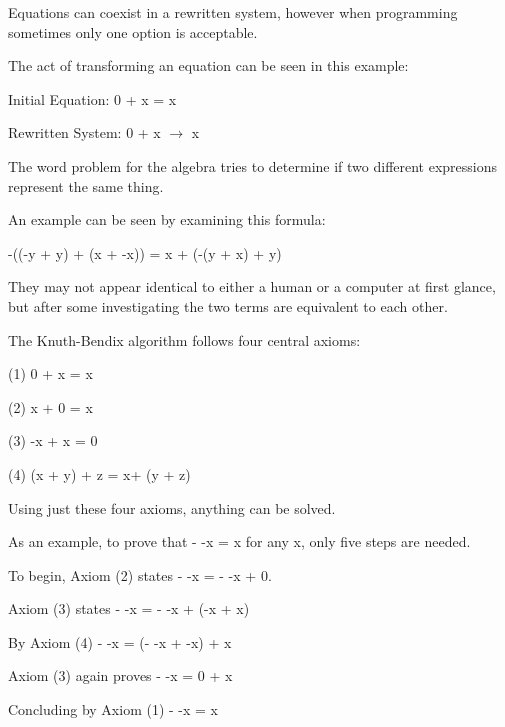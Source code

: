 \documentclass{article}
\begin{document}
\medskip\noindent
Equations can coexist in a rewritten system, however when programming sometimes only one option is acceptable. 

\medskip\noindent
The act of transforming an equation can be seen in this example:

\medskip\begin{center}
    Initial Equation: 0 + x = x
    
    Rewritten System: 0 + x $\rightarrow$ x
\end{center}

\medskip\noindent
The word problem for the algebra tries to determine if two different expressions represent the same thing. 

\medskip\noindent
An example can be seen by examining this formula:

\medskip\begin{center}
    -((-y + y) + (x + -x)) = x + (-(y + x) + y)
\end{center}

\medskip\noindent
They may not appear identical to either a human or a computer at first glance, but after some investigating the two terms are equivalent to each other. 

\begin{center}
\medskip\noindent
The Knuth-Bendix algorithm follows four central axioms:
\end{center}

\medskip
\begin{center}
(1)     0 + x = x

(2)     x + 0 = x

(3)     -x + x = 0

(4)     (x + y) + z = x+ (y + z)
\end{center}

\medskip\noindent
Using just these four axioms, anything can be solved. 

\medskip\noindent
As an example, to prove that - -x = x for any x, only five steps are needed.

\medskip\begin{center}
\medskip\noindent
To begin, Axiom (2) states - -x = - -x + 0.

\medskip\noindent
Axiom (3) states - -x = - -x + (-x + x)

\medskip\noindent
By Axiom (4) - -x = (- -x + -x) + x

\medskip\noindent
Axiom (3) again proves - -x = 0 + x

\medskip\noindent
Concluding by Axiom (1) - -x = x
\end{center}
\end{document}
